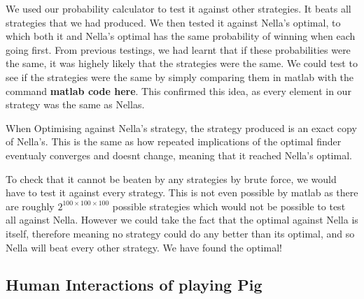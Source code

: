 \documentclass[a4paper,titlepage]{article}
\begin{document}
We used our probability calculator to test it against other strategies. It beats all strategies that we had produced. We then tested it against Nella's optimal, to which both it and Nella's optimal has the same probability of winning when each going first. From previous testings, we had learnt that if these probabilities were the same, it was highely likely that the strategies were the same. We could test to see if the strategies were the same by simply comparing them in matlab with the command \textbf{matlab code here}. This confirmed this idea, as every element in our strategy was the same as Nellas.

When Optimising against Nella's strategy, the strategy produced is an exact copy of Nella's. This is the same as how repeated implications of the optimal finder eventualy converges and doesnt change, meaning that it reached Nella's optimal.

To check that it cannot be beaten by any strategies by brute force, we would have to test it against every strategy. This is not even possible by matlab as there are roughly $2^{100\times100\times100}$ possible strategies which would not be possible to test all against Nella. However we could take the fact that the optimal against Nella is itself, therefore meaning no strategy could do any better than its optimal, and so Nella will beat every other strategy. We have found the optimal!

\subsection{Human Interactions of playing Pig}
\end{document}

